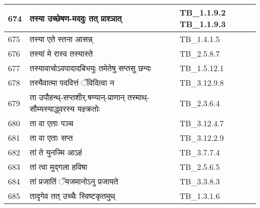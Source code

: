 \documentclass[17pt]{extarticle}
\begin{document}
\begin{longtable}{||p{0.4in}||p{4.9in}||p{0.9in}||}
    \hline
        
    674 & तस्या उच्छेषण{-}मददुः तत् प्राश्ञात् & TB\_1.1.9.2 TB\_1.1.9.3       \\
    
    \hline
        
    675 & तस्या एते स्तना आसन्न् & TB\_1.4.1.5       \\
    
    \hline
        
    676 & तस्यां मे रास्व तस्यास्ते & TB\_2.5.8.7       \\
    
    \hline
        
    677 & तस्यावाचोऽवपादादबिभयुः तमेतेषु सप्तसु छन्दः & TB\_1.5.12.1       \\
    
    \hline
        
    678 & तस्यैवात्मा पदवित्तं ॅविदित्वा न & TB\_3.12.9.8       \\
    
    \hline
        
    679 & ता उपौहन्थ्{-}सप्तशीर्.षण्यान्{-}प्राणान् तस्माथ्{-}सौम्यस्याद्ध्वरस्य यज्ञ्क्रतोः & TB\_2.3.6.4       \\
    
    \hline
        
    680 & ता वा एताः पञ्च & TB\_3.12.4.7       \\
    
    \hline
        
    681 & ता वा एताः सप्त & TB\_3.12.2.9       \\
    
    \hline
        
    682 & तां ते युनज्मि आऽहं & TB\_3.7.7.4       \\
    
    \hline
        
    683 & तां त्वा मुद्गला हविषा & TB\_2.5.6.5       \\
    
    \hline
        
    684 & तां प्रजातिं ॅयजमानोऽनु प्रजायते & TB\_3.3.8.3       \\
    
    \hline
        
    685 & तादृगेव तत् उच्चैः स्विष्टकृतमुथ् & TB\_1.3.1.6       \\
    
    \hline
        

\end{longtable}
\end{document}
